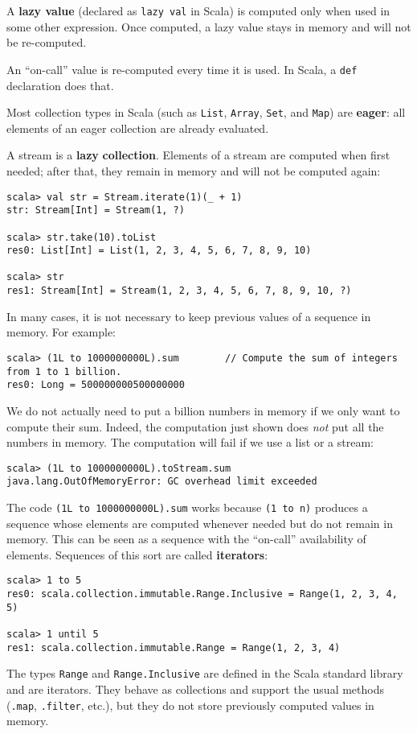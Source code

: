 A \textbf{lazy value} (declared as \lstinline!lazy val!
in Scala) is computed only when used in some other expression. Once
computed, a lazy value stays in memory and will not be re-computed.

An ``on-call'' value is re-computed every
time it is used. In Scala, a \lstinline!def! declaration does that.

Most collection types in Scala (such as \lstinline!List!, \lstinline!Array!,
\lstinline!Set!, and \lstinline!Map!) are \textbf{eager}:
all elements of an eager collection are already evaluated.

A stream is a \textbf{lazy} \textbf{collection}.
Elements of a stream are computed when first needed; after that, they
remain in memory and will not be computed again:
\begin{lstlisting}
scala> val str = Stream.iterate(1)(_ + 1)
str: Stream[Int] = Stream(1, ?)

scala> str.take(10).toList
res0: List[Int] = List(1, 2, 3, 4, 5, 6, 7, 8, 9, 10)

scala> str
res1: Stream[Int] = Stream(1, 2, 3, 4, 5, 6, 7, 8, 9, 10, ?)
\end{lstlisting}

In many cases, it is not necessary to keep previous values of a sequence
in memory. For example:

\begin{lstlisting}
scala> (1L to 1000000000L).sum        // Compute the sum of integers from 1 to 1 billion.
res0: Long = 500000000500000000
\end{lstlisting}
We do not actually need to put a billion numbers in memory if we only
want to compute their sum. Indeed, the computation just shown does
\emph{not} put all the numbers in memory. The computation will fail
if we use a list or a stream: 
\begin{lstlisting}
scala> (1L to 1000000000L).toStream.sum
java.lang.OutOfMemoryError: GC overhead limit exceeded
\end{lstlisting}

The code \lstinline!(1L to 1000000000L).sum! works because \lstinline!(1 to n)!
produces a sequence whose elements are computed whenever needed but
do not remain in memory. This can be seen as a sequence with the ``on-call''
availability of elements. Sequences of this sort are called \textbf{iterators}:
\begin{lstlisting}
scala> 1 to 5
res0: scala.collection.immutable.Range.Inclusive = Range(1, 2, 3, 4, 5)

scala> 1 until 5
res1: scala.collection.immutable.Range = Range(1, 2, 3, 4)
\end{lstlisting}
The types \lstinline!Range! and \lstinline!Range.Inclusive! are
defined in the Scala standard library and are iterators. They behave
as collections and support the usual methods (\lstinline!.map!, \lstinline!.filter!,
etc.), but they do not store previously computed values in memory.

